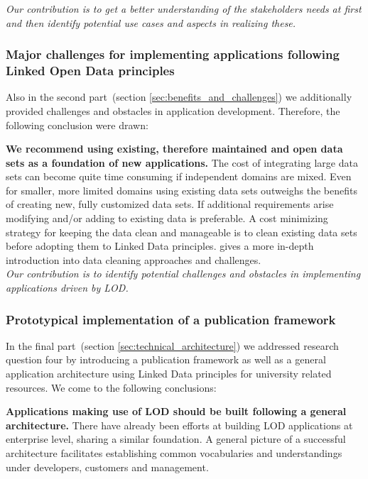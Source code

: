 \documentclass{article}
\begin{document}
\textit{Our contribution is to get a better understanding of the stakeholders needs at first and then identify potential use cases and aspects in realizing these.}

\subsubsection{Major challenges for implementing applications following Linked Open Data principles}
Also in the second part~(section \ref{sec:benefits_and_challenges}) we additionally provided challenges and obstacles in application development. 
Therefore, the following conclusion were drawn: 

\textbf{We recommend using existing, therefore maintained and open data sets as a foundation of new applications.}
The cost of integrating large data sets can become quite time consuming if independent domains are mixed. Even for smaller, more limited domains using existing data sets outweighs the benefits of creating new, fully customized data sets. If additional requirements arise modifying and/or adding to existing data is preferable. A cost minimizing strategy for keeping the data clean and manageable is to clean existing data sets before adopting them to Linked Data principles. \citet{artcle:rahm2000data} gives a more in-depth introduction into data cleaning approaches and challenges. \\

\textit{Our contribution is to identify potential challenges and obstacles in implementing applications driven by LOD.}

\subsubsection{Prototypical implementation of a publication framework}
In the final part~(section \ref{sec:technical_architecture}) we addressed research question four by introducing a publication framework as well as a general application architecture using Linked Data principles for university related resources. 
We come to the following conclusions:

\textbf{Applications making use of LOD should be built following a general architecture.}
There have already been efforts at building LOD applications at enterprise level, sharing a similar foundation. A general picture of a successful architecture facilitates establishing common vocabularies and understandings under developers, customers and management. \\
\end{document}
